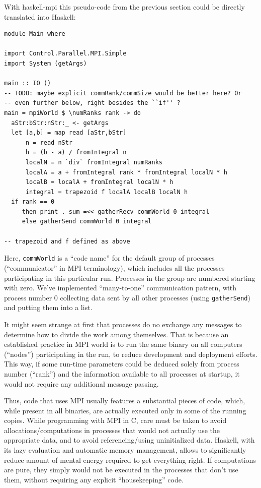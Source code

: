 \documentclass{tmr}
\begin{document}
With haskell-mpi this pseudo-code from the previous section could be
directly translated into Haskell:

\begin{Verbatim}
module Main where

import Control.Parallel.MPI.Simple
import System (getArgs)

main :: IO ()
-- TODO: maybe explicit commRank/commSize would be better here? Or
-- even further below, right besides the ``if'' ?
main = mpiWorld $ \numRanks rank -> do
  aStr:bStr:nStr:_ <- getArgs
  let [a,b] = map read [aStr,bStr]
      n = read nStr
      h = (b - a) / fromIntegral n
      localN = n `div` fromIntegral numRanks
      localA = a + fromIntegral rank * fromIntegral localN * h
      localB = localA + fromIntegral localN * h
      integral = trapezoid f localA localB localN h
  if rank == 0
     then print . sum =<< gatherRecv commWorld 0 integral
     else gatherSend commWorld 0 integral

-- trapezoid and f defined as above
\end{Verbatim}

Here, \verb|commWorld| is a ``code name'' for the default group of processes
(``communicator'' in MPI terminology), which includes all the
processes participating in this particular run. Processes in the group
are numbered starting with zero. We've implemented
``many-to-one'' communication pattern, with process number 0
collecting data sent by all other processes (using \verb|gatherSend|)
and putting them into a list.

It might seem strange at first that processes do no exchange any
messages to determine how to divide the work among themselves. That is
because an established practice in MPI world is to run the same binary
on all computers (``nodes'') participating in the run, to reduce
development and deployment efforts. This way, if some run-time
parameters could be deduced solely from process number (``rank'') and
the information available to all processes at startup, it would not
require any additional message passing.

Thus, code that uses MPI usually features a substantial pieces of code,
which, while present in all binaries, are actually executed only in
some of the running copies. While programming with MPI in C, care must
be taken to avoid allocations/computations in processes that would not
actually use the appropriate data, and to avoid referencing/using
uninitialized data. Haskell, with its lazy evaluation and automatic
memory management, allows to significantly reduce amount of mental
energy required to get everything right. If computations are pure,
they simply would not be executed in the processes that don't use
them, without requiring any explicit ``housekeeping'' code.
\end{document}
